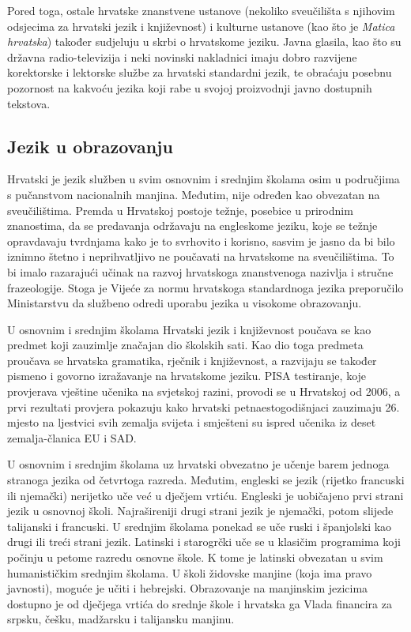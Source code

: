 \begin{multicols}{2}

Pored toga, ostale hrvatske znanstvene ustanove (nekoliko sveučilišta s njihovim odsjecima za hrvatski jezik i književnost) i kulturne ustanove (kao što je \emph{Matica hrvatska}) također sudjeluju u skrbi o hrvatskome jeziku. Javna glasila, kao što su državna radio-televizija i neki novinski nakladnici imaju dobro razvijene korektorske i lektorske službe za hrvatski standardni jezik, te obraćaju posebnu pozornost na kakvoću jezika koji rabe u svojoj proizvodnji javno dostupnih tekstova.

\subsection{Jezik u obrazovanju}

Hrvatski je jezik služben u svim osnovnim i srednjim školama osim u područjima s pučanstvom nacionalnih manjina. Međutim, nije određen kao obvezatan na sveučilištima. Premda u Hrvatskoj postoje težnje, posebice u prirodnim znanostima, da se predavanja održavaju na engleskome jeziku, koje se težnje opravdavaju tvrdnjama kako je to svrhovito i korisno, sasvim je jasno da bi bilo iznimno štetno i neprihvatljivo ne poučavati na hrvatskome na sveučilištima. To bi imalo razarajući učinak na razvoj hrvatskoga znanstvenoga nazivlja i stručne frazeologije. Stoga je Vijeće za normu hrvatskoga standardnoga jezika preporučilo Ministarstvu da službeno odredi uporabu jezika u visokome obrazovanju.

U osnovnim i srednjim školama Hrvatski jezik i književnost poučava se kao predmet koji zauzimlje značajan dio školskih sati. Kao dio toga predmeta proučava se hrvatska gramatika, rječnik i književnost, a razvijaju se također pismeno i govorno izražavanje na hrvatskome jeziku. PISA testiranje, koje provjerava vještine učenika na svjetskoj razini, provodi se u Hrvatskoj od 2006, a prvi rezultati provjera pokazuju kako hrvatski petnaestogodišnjaci zauzimaju 26. mjesto na ljestvici svih zemalja svijeta i smješteni su ispred učenika iz deset zemalja-članica EU i SAD.

U osnovnim i srednjim školama uz hrvatski obvezatno je učenje barem jednoga stranoga jezika od četvrtoga razreda. Međutim, engleski se jezik (rijetko francuski ili njemački) nerijetko uče već u dječjem vrtiću. Engleski je uobičajeno prvi strani jezik u osnovnoj školi. Najrašireniji drugi strani jezik je njemački, potom slijede talijanski i francuski. U srednjim školama ponekad se uče ruski i španjolski kao drugi ili treći strani jezik. Latinski i starogrčki uče se u klasičim programima koji počinju u petome razredu osnovne škole. K tome je latinski obvezatan u svim humanističkim srednjim školama. U školi židovske manjine (koja ima pravo javnosti), moguće je učiti i hebrejski. Obrazovanje na manjinskim jezicima dostupno je od dječjega vrtića do srednje škole i hrvatska ga Vlada financira za srpsku, češku, madžarsku i talijansku manjinu.


\end{multicols}
